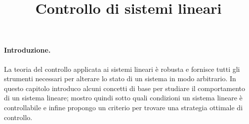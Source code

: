 \title{Controllo di sistemi lineari}
\maketitle
\label{sec:linear-control}

\paragraph{Introduzione.}

La teoria del controllo applicata ai sistemi lineari è robusta e fornisce tutti gli strumenti necessari
per alterare lo stato di un sistema in modo arbitrario.
In questo capitolo introduco alcuni
concetti di base per studiare il comportamento di un sistema lineare; mostro quindi sotto quali
condizioni un sistema lineare è controllabile e infine propongo un criterio per trovare una strategia
ottimale di controllo.



